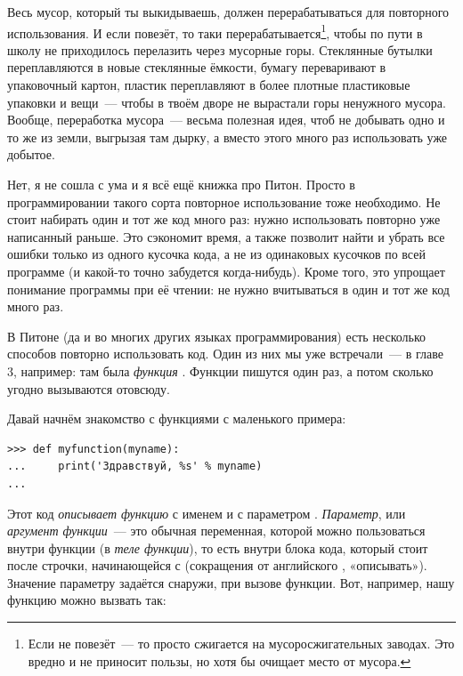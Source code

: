 Весь мусор, который ты выкидываешь, должен перерабатываться для повторного использования. И если повезёт, то таки перерабатывается\footnote{Если не повезёт — то просто сжигается на мусоросжигательных заводах. Это вредно и не приносит пользы, но хотя бы очищает место от мусора.}, чтобы по пути в школу не приходилось перелазить через мусорные горы. Стеклянные бутылки переплавляются в новые стеклянные ёмкости, бумагу переваривают в упаковочный картон, пластик переплавляют в более плотные пластиковые упаковки и вещи — чтобы в твоём дворе не вырастали горы ненужного мусора. Вообще, переработка мусора — весьма полезная идея, чтоб не добывать одно и то же из земли, выгрызая там дырку, а вместо этого много раз использовать уже добытое.

Нет, я не сошла с ума и я всё ещё книжка про Питон. Просто в программировании такого сорта повторное использование тоже необходимо. Не стоит набирать один и тот же код много раз: нужно использовать повторно уже написанный раньше. Это сэкономит время, а также позволит найти и убрать все ошибки только из одного кусочка кода, а не из одинаковых кусочков по всей программе (и какой-то точно забудется когда-нибудь). Кроме того, это упрощает понимание программы при её чтении: не нужно вчитываться в один и тот же код много раз.

В Питоне (да и во многих других языках программирования) есть несколько способов повторно использовать код. Один из них мы уже встречали — в главе 3, например: там была \emph{функция} . Функции пишутся один раз, а потом сколько угодно вызываются отовсюду.

Давай начнём знакомство с функциями с маленького примера:

\begin{listing}
\begin{verbatim}
>>> def myfunction(myname):
...     print('Здравствуй, %s' % myname)
...
\end{verbatim}
\end{listing}

Этот код \emph{описывает функцию} с именем  и с параметром . \emph{Параметр}, или \emph{аргумент функции} — это обычная переменная, которой можно пользоваться внутри функции (в \emph{теле функции}), то есть внутри блока кода, который стоит после строчки, начинающейся с  (сокращения от английского , «описывать»). Значение параметру задаётся снаружи, при вызове функции. Вот, например, нашу функцию можно вызвать так:

